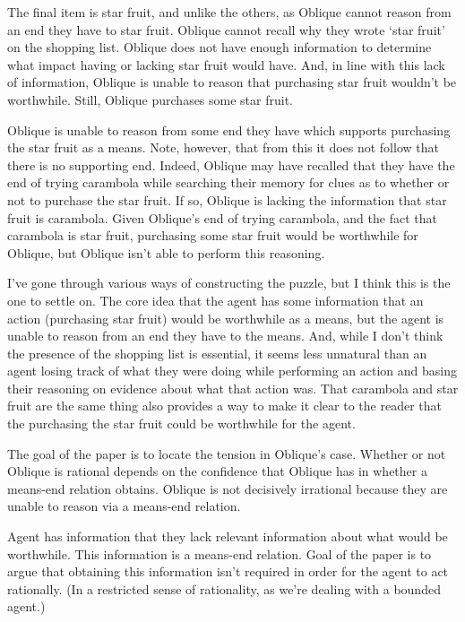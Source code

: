 \documentclass[10pt]{article}
\begin{document}
\begin{scenario}
  The final item is star fruit, and unlike the others, as Oblique cannot reason from an end they have to star fruit.
  Oblique cannot recall why they wrote `star fruit' on the shopping list.
  Oblique does not have enough information to determine what impact having or lacking star fruit would have.
  And, in line with this lack of information, Oblique is unable to reason that purchasing star fruit wouldn't be worthwhile.
  Still, Oblique purchases some star fruit.
\end{scenario}

Oblique is unable to reason from some end they have which supports purchasing the star fruit as a means.
Note, however, that from this it does not follow that there is no supporting end.
Indeed, Oblique may have recalled that they have the end of trying carambola while searching their memory for clues as to whether or not to purchase the star fruit.
If so, Oblique is lacking the information that star fruit is carambola.
Given Oblique's end of trying carambola, and the fact that carambola is star fruit, purchasing some star fruit would be worthwhile for Oblique, but Oblique isn't able to perform this reasoning.

\begin{note}
  I've gone through various ways of constructing the puzzle, but I think this is the one to settle on.
  The core idea that the agent has some information that an action (purchasing star fruit) would be worthwhile as a means, but the agent is unable to reason from an end they have to the means.
  And, while I don't think the presence of the shopping list is essential, it seems less unnatural than an agent losing track of what they were doing while performing an action and basing their reasoning on evidence about what that action was.
  That carambola and star fruit are the same thing also provides a way to make it clear to the reader that the purchasing the star fruit could be worthwhile for the agent.
\end{note}

\begin{note}
  The goal of the paper is to locate the tension in Oblique's case.
  Whether or not Oblique is rational depends on the confidence that Oblique has in whether a means-end relation obtains.
  Oblique is not decisively irrational because they are unable to reason via a means-end relation.
\end{note}

\begin{note}
  Agent has information that they lack relevant information about what would be worthwhile.
  This information is a means-end relation.
  Goal of the paper is to argue that obtaining this information isn't required in order for the agent to act rationally.
  (In a restricted sense of rationality, as we're dealing with a bounded agent.)
\end{note}
\end{document}
